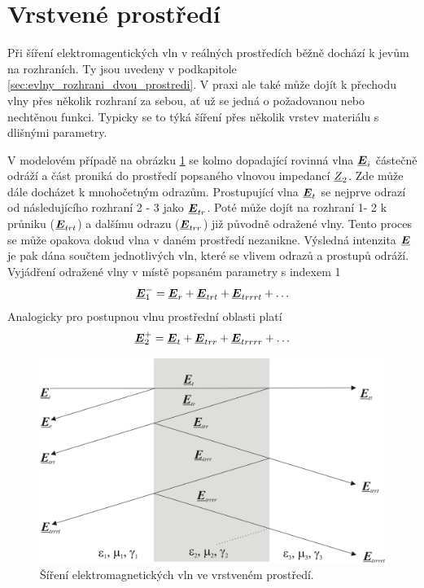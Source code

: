 \section{Vrstvené prostředí}
Při šíření elektromagentických vln v reálných prostředích běžně dochází k jevům na rozhraních. Ty jsou uvedeny v podkapitole \ref{sec:evlny_rozhrani_dvou_prostredi}. V praxi ale také může dojít k přechodu vlny přes několik rozhraní za sebou, ať už se jedná o požadovanou nebo nechtěnou funkci. Typicky se to týká šíření přes několik vrstev materiálu s dlišnými parametry.

V modelovém případě na obrázku \ref{obr:evlny_vrstvene_rada} se kolmo dopadající rovinná vlna $\mbox{\underline{\boldmath$E$}}_{i}$ částečně odráží a část proniká do prostředí popsaného vlnovou impedancí ${\underline{Z}}_{2}$. Zde může dále docházet k mnohočetným odrazům. Prostupující vlna $\mbox{\underline{\boldmath$E$}}_{t}$ se nejprve odrazí od následujícího rozhraní 2 - 3 jako $\mbox{\underline{\boldmath$E$}}_{tr}$. Poté může dojít na rozhraní 1- 2  k průniku ($\mbox{\underline{\boldmath$E$}}_{trt}$) a dalšímu odrazu ($\mbox{\underline{\boldmath$E$}}_{trr}$) již původně odražené vlny. Tento proces se může opakova dokud vlna v daném prostředí nezanikne. Výsledná intenzita $\mbox{\underline{\boldmath$E$}}$ je pak dána součtem jednotlivých vln, které se vlivem odrazů a prostupů odráží. Vyjádření odražené vlny v místě popsaném parametry s indexem 1
\begin{equation}
	\mbox{\underline{\boldmath$E$}}_{1}^{-} = \mbox{\underline{\boldmath$E$}}_{r} + \mbox{\underline{\boldmath$E$}}_{trt} + \mbox{\underline{\boldmath$E$}}_{trrrt} + \ldots
	\label{rce:evlny_vrstvene_rada1}
\end{equation}
Analogicky pro postupnou vlnu prostřední oblasti platí
\begin{equation}
	\mbox{\underline{\boldmath$E$}}_{2}^{+} = \mbox{\underline{\boldmath$E$}}_{t} + \mbox{\underline{\boldmath$E$}}_{trr} + \mbox{\underline{\boldmath$E$}}_{trrrr} + \ldots
	\label{rce:evlny_vrstvene_rada2}
\end{equation}
\begin{figure}[!h]
	\centering
	\includegraphics[width=12cm]{evlny_vrstvene_rada.png}
	\caption{Šíření elektromagnetických vln ve vrstveném prostředí.\cite{emp}}
	\label{obr:evlny_vrstvene_rada}
\end{figure}

